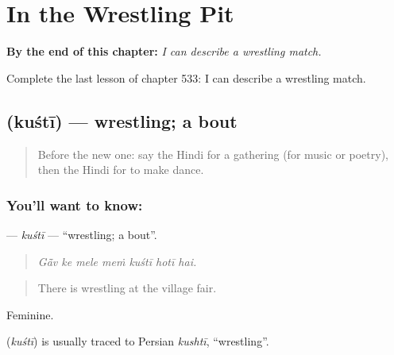 
\chapter{In the Wrestling Pit}
\label{ch:hi-in-the-wrestling-pit}

\begin{chapteropening}
\textbf{By the end of this chapter:} \emph{I can describe a wrestling match.}

Complete the last lesson of chapter 533: I can describe a wrestling match.
\end{chapteropening}

\section[\texorpdfstring{\hi{कुश्ती} (kuśtī)}{कुश्ती (kuśtī)}]{ (kuśtī) — wrestling; a bout}

\label{lesson:HI-C533-kusti}



\begin{quote}
Before the new one: say the Hindi for a gathering (for music or poetry), then the Hindi for to make dance.
\end{quote}

\subsection*{You'll want to know: }
\textbf{} — \emph{kuśtī} — \textquotedblleft{}wrestling; a bout\textquotedblright{}.

\begin{quote}
      
\end{quote}

\begin{quote}
\emph{Gā̃v ke mele meṁ kuśtī hotī hai.}
\end{quote}

\begin{quote}
There is wrestling at the village fair.
\end{quote}

Feminine.

\begin{cousinweb}
\textbf{} (\emph{kuśtī}) is usually traced to Persian \emph{kushtī}, \textquotedblleft{}wrestling\textquotedblright{}.
\end{cousinweb}

